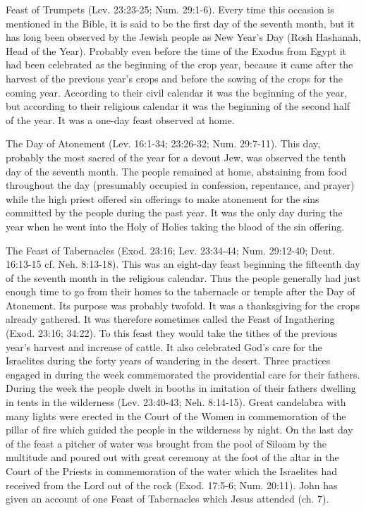 Feast of Trumpets (Lev. 23:23-25; Num. 29:1-6). Every time this occasion is mentioned in the Bible, it is said to be the first day of the seventh month, but it has long been observed by the Jewish people as New Year's Day (Rosh Hashanah, Head of the Year). Probably even before the time of the Exodus from Egypt it had been celebrated as the beginning of the crop year, because it came after the harvest of the previous year's crops and before the sowing of the crops for the coming year. According to their civil calendar it was the beginning of the year, but according to their religious calendar it was the beginning of the second half of the year. It was a one-day feast observed at home.

The Day of Atonement (Lev. 16:1-34; 23:26-32; Num. 29:7-11). This day, probably the most sacred of the year for a devout Jew, was observed the tenth day of the seventh month. The people remained at home, abstaining from food throughout the day (presumably occupied in confession, repentance, and prayer) while the high priest offered sin offerings to make atonement for the sins committed by the people during the past year. It was the only day during the year when he went into the Holy of Holies taking the blood of the sin offering.

The Feast of Tabernacles (Exod. 23:16; Lev. 23:34-44; Num. 29:12-40; Deut. 16:13-15 cf. Neh. 8:13-18). This was an eight-day feast beginning the fifteenth day of the seventh month in the religious calendar. Thus the people generally had just enough time to go from their homes to the tabernacle or temple after the Day of Atonement. Its purpose was probably twofold. It was a thanksgiving for the crops already gathered. It was therefore sometimes called the Feast of Ingathering (Exod. 23:16; 34:22). To this feast they would take the tithes of the previous year's harvest and increase of cattle. It also celebrated God's care for the Israelites during the forty years of wandering in the desert. Three practices engaged in during the week commemorated the providential care for their fathers. During the week the people dwelt in booths in imitation of their fathers dwelling in tents in the wilderness (Lev. 23:40-43; Neh. 8:14-15). Great candelabra with many lights were erected in the Court of the Women in commemoration of the pillar of fire which guided the people in the wilderness by night. On the last day of the feast a pitcher of water was brought from the pool of Siloam by the multitude and poured out with great ceremony at the foot of the altar in the Court of the Priests in commemoration of the water which the Israelites had received from the Lord out of the rock (Exod. 17:5-6; Num. 20:11). John has given an account of one Feast of Tabernacles which Jesus attended (ch. 7).

